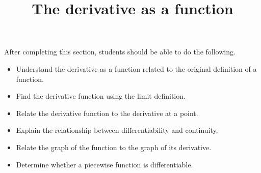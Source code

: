 \documentclass{ximera}
\title{The derivative as a function}
\begin{document}
\begin{abstract}
\end{abstract}

\maketitle

\begin{sectionOutcomes}

After completing this section, students should be able to do the following.

\begin{itemize}
\item Understand the derivative as a function related to the original
  definition of a function.
\item Find the derivative function using the limit definition.
\item Relate the derivative function to the derivative at a point.
\item Explain the relationship between differentiability and continuity.
\item Relate the graph of the function to the graph of its derivative.
\item Determine whether a piecewise function is differentiable.
\end{itemize}

\end{sectionOutcomes}
\end{document}
